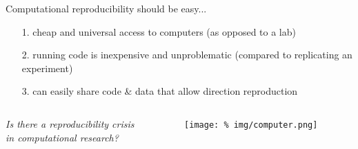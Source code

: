 \begin{frame}{Computational reproducibility should be easy...}

  \vspace{0.7cm}
  
  \begin{itemize}[leftmargin=1.2cm, rightmargin=1cm]

    \itemsep10pt

  \item[1.] cheap and universal access to computers (as opposed to a lab)
  \item[2.] running code is inexpensive and unproblematic (compared to replicating an experiment)
  \item[3.] can easily share code \& data that allow direction reproduction
    
    
  \end{itemize}

  \begin{columns}
    \begin{column}{.625\textwidth}
      \minipage[c][0.45\textheight][s]{\columnwidth}

      \vspace{1.2cm}
      \begin{center}
        \textit{Is there a reproducibility crisis\\ in computational research?}
      \end{center}        
      
      \endminipage      
    \end{column}
    \begin{column}{.375\textwidth}
      \vspace{-1cm}
      \begin{figure}
        \centering
        \texttt{[image: \%
          img/computer.png]} %
      \end{figure}
      
    \end{column}
  \end{columns}
  


  
\end{frame}

